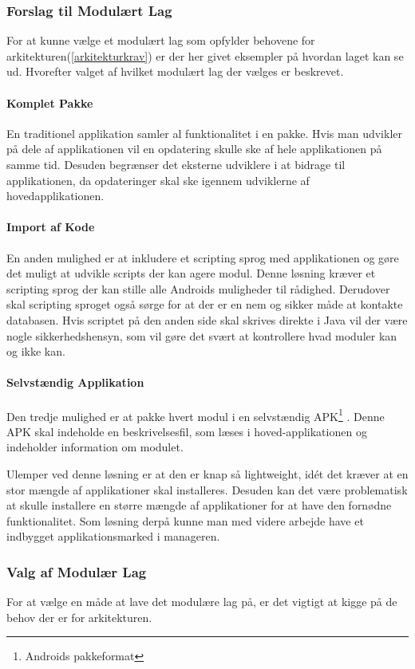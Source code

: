 \subsubsection{Forslag til Modulært Lag}
For at kunne vælge et modulært lag som opfylder behovene for arkitekturen(\cref{arkitekturkrav}) er der her givet eksempler på hvordan laget kan se ud.
Hvorefter valget af hvilket modulært lag der vælges er beskrevet.

\paragraph{Komplet Pakke}
En traditionel applikation samler al funktionalitet i en pakke.
Hvis man udvikler på dele af applikationen vil en opdatering skulle ske af hele applikationen på samme tid.
Desuden begrænser det eksterne udviklere i at bidrage til applikationen, da opdateringer skal ske igennem udviklerne af hovedapplikationen.

\paragraph{Import af Kode}
En anden mulighed er at inkludere et scripting sprog med applikationen og gøre det muligt at udvikle scripts der kan agere modul.
Denne løsning kræver et scripting sprog der kan  stille alle Androids muligheder til rådighed.
Derudover skal scripting sproget også sørge for at der er en nem og sikker måde at kontakte databasen.
Hvis scriptet på den anden side skal skrives direkte i Java vil der være nogle sikkerhedshensyn, som vil gøre det svært at kontrollere hvad moduler kan og ikke kan.

\paragraph{Selvstændig Applikation}
Den tredje mulighed er at pakke hvert modul i en selvstændig APK\footnote{Androids pakkeformat} \citep{misc:apk}.
Denne APK skal indeholde en beskrivelsesfil, som læses i hoved-applikationen og indeholder information om modulet.

Ulemper ved denne løsning er at den er knap så lightweight, idét det kræver at en stor mængde af applikationer skal installeres.
Desuden kan det være problematisk at skulle installere en større mængde af applikationer for at have den fornødne funktionalitet.
Som løsning derpå kunne man med videre arbejde have et indbygget applikationsmarked i manageren.

\subsubsection{Valg af Modulær Lag}
For at vælge en måde at lave det modulære lag på, er det vigtigt at kigge på de behov der er for arkitekturen.

